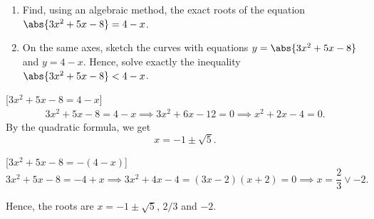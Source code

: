 \begin{problem}
    \begin{enumerate}
        \item Find, using an algebraic method, the exact roots of the equation $\abs{3x^2 + 5x - 8} = 4-x$.
        \item On the same axes, sketch the curves with equations $y = \abs{3x^2 + 5x - 8}$ and $y = 4-x$. Hence, solve exactly the inequality $\abs{3x^2 + 5x - 8} < 4-x$.
    \end{enumerate}
\end{problem}
\begin{solution}
    \begin{ppart}
        [$3x^2 + 5x - 8 = 4-x$]
        \begin{gather*}
            3x^2 + 5x - 8 = 4-x \implies 3x^2 + 6x - 12 = 0 \implies x^2 + 2x - 4 = 0.
        \end{gather*}
        By the quadratic formula, we get \[x = -1\pm\sqrt5.\]

        [$3x^2 + 5x - 8 = -(4-x)$]
        \[3x^2 + 5x - 8 = -4 + x \implies 3x^2 + 4x - 4 = (3x-2)(x+2) = 0 \implies x = \frac23 \lor -2.\]

        Hence, the roots are $x = -1\pm\sqrt5$, $2/3$ and $-2$.
    \end{ppart}
    \begin{ppart}
        \begin{center}
\end{center}
\end{ppart}
\end{solution}
